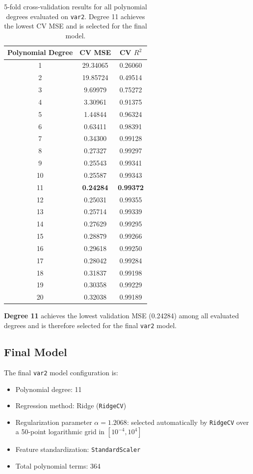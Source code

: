 \documentclass[10.5pt,a4paper]{article}
\begin{document}
\begin{table}[H]
\centering
\small
\begin{tabular}{ccc}
\toprule
Polynomial Degree & CV MSE & CV $R^2$ \\
\midrule
1  & 29.34065 & 0.26060 \\
2  & 19.85724 & 0.49514 \\
3  &  9.69979 & 0.75272 \\
4  &  3.30961 & 0.91375 \\
5  &  1.44844 & 0.96324 \\
6  &  0.63411 & 0.98391 \\
7  &  0.34300 & 0.99128 \\
8  &  0.27327 & 0.99297 \\
9  &  0.25543 & 0.99341 \\
10 &  0.25587 & 0.99343 \\
11 & \textbf{0.24284} & \textbf{0.99372} \\
12 &  0.25031 & 0.99355 \\
13 &  0.25714 & 0.99339 \\
14 &  0.27629 & 0.99295 \\
15 &  0.28879 & 0.99266 \\
16 &  0.29618 & 0.99250 \\
17 &  0.28042 & 0.99284 \\
18 &  0.31837 & 0.99198 \\
19 &  0.30358 & 0.99229 \\
20 &  0.32038 & 0.99189 \\
\bottomrule
\end{tabular}
\caption{5-fold cross-validation results for all polynomial degrees
evaluated on \texttt{var2}.  Degree 11 achieves the lowest CV MSE
and is selected for the final model.}
\end{table}

\textbf{Degree 11} achieves the lowest validation MSE (0.24284) among
all evaluated degrees and is therefore selected for the final
\texttt{var2} model.

\subsection{Final Model}

The final \texttt{var2} model configuration is:

\begin{itemize}
    \item Polynomial degree: 11
    \item Regression method: Ridge (\texttt{RidgeCV})
    \item Regularization parameter $\alpha = 1.2068$: selected
    automatically by \texttt{RidgeCV} over a 50-point logarithmic
    grid in $[10^{-4}, 10^4]$
    \item Feature standardization: \texttt{StandardScaler}
    \item Total polynomial terms: 364
\end{itemize}
\end{document}
